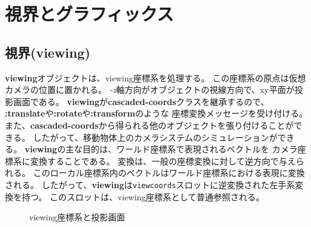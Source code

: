 \section{視界とグラフィックス}

\subsection{視界(viewing)}
{\bf viewing}オブジェクトは、viewing座標系を処理する。
この座標系の原点は仮想カメラの位置に置かれる。
{\em -z}軸方向がオブジェクトの視線方向で、xy平面が投影画面である。
{\bf viewing}が{\bf cascaded-coords}クラスを継承するので、
{\bf :translate}や{\bf :rotate}や{\bf :transform}のような
座標変換メッセージを受け付ける。
また、{\bf cascaded-coords}から得られる他のオブジェクトを張り付けることができる。
したがって、移動物体上のカメラシステムのシミュレーションができる。
{\bf viewing}の主な目的は、ワールド座標系で表現されるベクトルを
カメラ座標系に変換することである。
変換は、一般の座標変換に対して逆方向で与えられる。
このローカル座標系内のベクトルはワールド座標系における表現に変換される。
したがって、{\bf viewing}は{\tt viewcoords}スロットに逆変換された左手系変換を持つ。
このスロットは、viewing座標系として普通参照される。

\begin{figure}
\begin{center}
\end{center}
\caption{viewing座標系と投影画面}
\end{figure}

